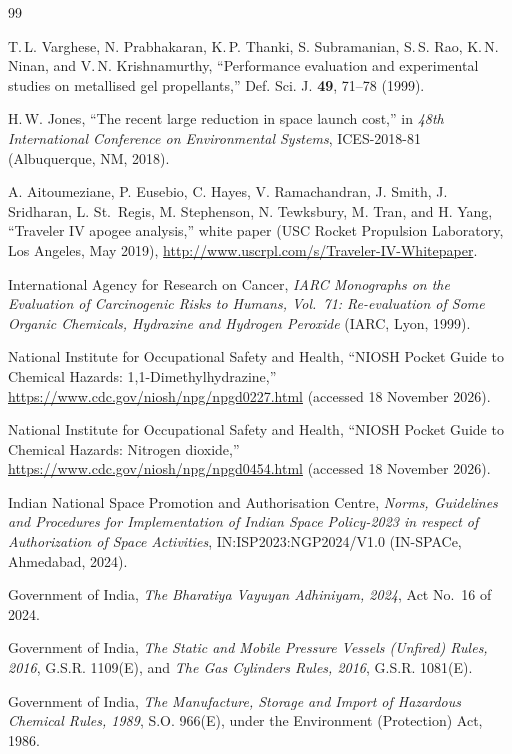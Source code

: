 \documentclass[11pt,a4paper]{article}
\begin{document}
\begin{thebibliography}{99}

 T.\,L. Varghese, N. Prabhakaran, K.\,P. Thanki, S. Subramanian, S.\,S. Rao, K.\,N. Ninan, and V.\,N. Krishnamurthy, ``Performance evaluation and experimental studies on metallised gel propellants,'' Def. Sci. J. \textbf{49}, 71--78 (1999).

 H.\,W. Jones, ``The recent large reduction in space launch cost,'' in \emph{48th International Conference on Environmental Systems}, ICES-2018-81 (Albuquerque, NM, 2018).

 A. Aitoumeziane, P. Eusebio, C. Hayes, V. Ramachandran, J. Smith, J. Sridharan, L. St.~Regis, M. Stephenson, N. Tewksbury, M. Tran, and H. Yang, ``Traveler IV apogee analysis,'' white paper (USC Rocket Propulsion Laboratory, Los Angeles, May 2019), \url{http://www.uscrpl.com/s/Traveler-IV-Whitepaper}.

 International Agency for Research on Cancer, \emph{IARC Monographs on the Evaluation of Carcinogenic Risks to Humans, Vol.~71: Re-evaluation of Some Organic Chemicals, Hydrazine and Hydrogen Peroxide} (IARC, Lyon, 1999).

 National Institute for Occupational Safety and Health, ``NIOSH Pocket Guide to Chemical Hazards: 1,1-Dimethylhydrazine,'' \url{https://www.cdc.gov/niosh/npg/npgd0227.html} (accessed 18 November 2026).

 National Institute for Occupational Safety and Health, ``NIOSH Pocket Guide to Chemical Hazards: Nitrogen dioxide,'' \url{https://www.cdc.gov/niosh/npg/npgd0454.html} (accessed 18 November 2026).

 Indian National Space Promotion and Authorisation Centre, \emph{Norms, Guidelines and Procedures for Implementation of Indian Space Policy-2023 in respect of Authorization of Space Activities}, IN:ISP2023:NGP2024/V1.0 (IN-SPACe, Ahmedabad, 2024).

 Government of India, \emph{The Bharatiya Vayuyan Adhiniyam, 2024}, Act No.~16 of 2024.

 Government of India, \emph{The Static and Mobile Pressure Vessels (Unfired) Rules, 2016}, G.S.R. 1109(E), and \emph{The Gas Cylinders Rules, 2016}, G.S.R. 1081(E).

 Government of India, \emph{The Manufacture, Storage and Import of Hazardous Chemical Rules, 1989}, S.O. 966(E), under the Environment (Protection) Act, 1986.

\end{thebibliography}
\end{document}
